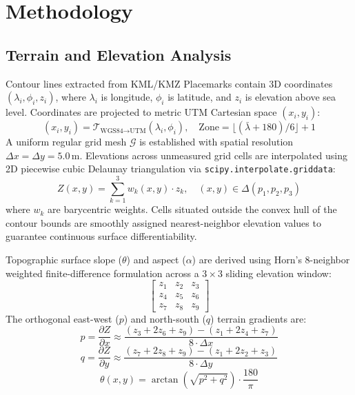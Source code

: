 \documentclass[manuscript,screen,review]{acmart}
\begin{document}
\section{Methodology}
\label{sec:methodology}

\subsection{Terrain and Elevation Analysis}
Contour lines extracted from KML/KMZ Placemarks contain 3D coordinates $(\lambda_i, \phi_i, z_i)$, where $\lambda_i$ is longitude, $\phi_i$ is latitude, and $z_i$ is elevation above sea level. Coordinates are projected to metric UTM Cartesian space $(x_i, y_i)$:
\begin{equation}
    (x_i, y_i) = \mathcal{T}_{\text{WGS84} \rightarrow \text{UTM}}(\lambda_i, \phi_i), \quad \text{Zone} = \lfloor(\bar{\lambda} + 180)/6\rfloor + 1
\end{equation}
A uniform regular grid mesh $\mathcal{G}$ is established with spatial resolution $\Delta x = \Delta y = 5.0$\,m. Elevations across unmeasured grid cells are interpolated using 2D piecewise cubic Delaunay triangulation via \texttt{scipy.interpolate.griddata}:
\begin{equation}
    Z(x, y) = \sum_{k=1}^3 w_k(x, y) \cdot z_k, \quad (x, y) \in \Delta(p_1, p_2, p_3)
\end{equation}
where $w_k$ are barycentric weights. Cells situated outside the convex hull of the contour bounds are smoothly assigned nearest-neighbor elevation values to guarantee continuous surface differentiability.

Topographic surface slope ($\theta$) and aspect ($\alpha$) are derived using Horn's 8-neighbor weighted finite-difference formulation across a $3 \times 3$ sliding elevation window:
\begin{equation}
\begin{bmatrix}
z_{1} & z_{2} & z_{3} \\
z_{4} & z_{5} & z_{6} \\
z_{7} & z_{8} & z_{9}
\end{bmatrix}
\end{equation}
The orthogonal east-west ($p$) and north-south ($q$) terrain gradients are:
\begin{equation}
    p = \frac{\partial Z}{\partial x} \approx \frac{(z_{3} + 2z_{6} + z_{9}) - (z_{1} + 2z_{4} + z_{7})}{8 \cdot \Delta x}
\end{equation}
\begin{equation}
    q = \frac{\partial Z}{\partial y} \approx \frac{(z_{7} + 2z_{8} + z_{9}) - (z_{1} + 2z_{2} + z_{3})}{8 \cdot \Delta y}
\end{equation}
\begin{equation}
    \theta(x, y) = \arctan\left(\sqrt{p^2 + q^2}\right) \cdot \frac{180}{\pi}
\end{equation}
\end{document}
